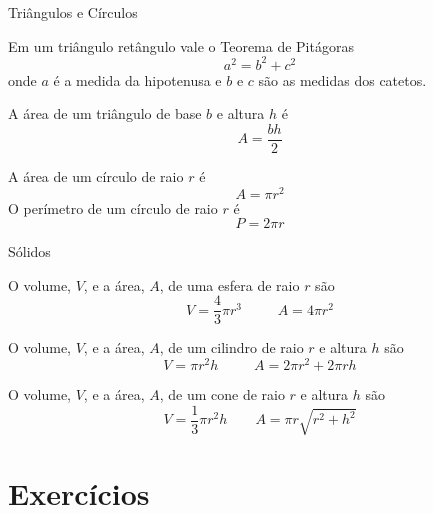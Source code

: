 \begin{teoria}{Triângulos e Círculos}
    
    Em um triângulo retângulo vale o Teorema de Pitágoras
    \[ a^2 = b^2 + c^2 \]
    onde $a$ é a medida da hipotenusa e $b$ e $c$ são as medidas dos catetos.

    A área de um triângulo de base $b$ e altura $h$ é \[A = \frac{bh}{2}\]
        
    A área de um círculo de raio $r$ é \[A=\pi r^2\]
    O perímetro de um círculo de raio $r$ é \[P=2\pi r\]
        
\end{teoria}    

\begin{teoria}{Sólidos}
    
    O volume, $V$, e a área, $A$, de uma esfera de raio $r$ são
    \[ V = \frac{4}{3} \pi r^3    \;\;\qquad A = 4\pi r^2 \]

    O volume, $V$, e a área, $A$, de um cilindro de raio $r$ e altura $h$ são
    \[ V = \pi r^2 h              \;\;\qquad A = 2\pi r^2 + 2\pi rh\]
    
    O volume, $V$, e a área, $A$, de um cone de raio $r$ e altura $h$ são
    \[ V = \frac{1}{3}\pi r^2 h   \qquad   A = \pi r \sqrt{r^2+h^2} \]
    
\end{teoria}    

\section{Exercícios}


\vspace{\baselineskip}











